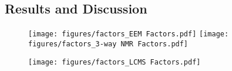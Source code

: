 \subsection*{Results and Discussion}



\begin{figure}[H]
    \centering
    \texttt{[image: figures/factors\_EEM Factors.pdf]}
    \texttt{[image: figures/factors\_3-way NMR Factors.pdf]}
    \caption{}
    \label{fig:plot_factors}
\end{figure}
\begin{figure}[H]
    \centering
    \texttt{[image: figures/factors\_LCMS Factors.pdf]}
    \caption{}
    \label{fig:plot_factors}
\end{figure}